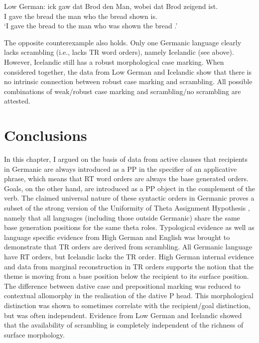 \begin{exe}
	 Low German:
	\gll ick gaw dat Brod den Man, wobei dat Brod zeigend ist.\\
	I gave the bread the man who the bread shown is.\\
	\trans `I gave the bread to the man who was shown the bread \citep{Mussaus.1829}.'
\end{exe}

The opposite counterexample also holds. Only one Germanic language clearly lacks scrambling (i.e., lacks TR word orders), namely Icelandic (see above). However, Icelandic still has a robust morphological case marking. When considered together, the data from Low German and Icelandic show that there is no intrinsic connection between robust case marking and scrambling. All possible combinations of weak/robust case marking and scrambling/no scrambling are attested.

\section{Conclusions}
In this chapter, I argued on the basis of data from active clauses that recipients in Germanic are always introduced as a PP in the specifier of an applicative phrase, which means that RT word orders are always the base generated orders. Goals, on the other hand, are introduced as a PP object in the complement of the verb. The claimed universal nature of these syntactic orders in Germanic proves a subset of the strong version of the Uniformity of Theta Assignment Hypothesis \citep{Baker.1988}, namely that all languages (including those outside Germanic) share the same base generation positions for the same theta roles.
	Typological evidence as well as language specific evidence from High German and English was brought to demonstrate that TR orders are derived from scrambling. All Germanic language have RT orders, but Icelandic lacks the TR order. High German internal evidence and data from marginal reconstruction in TR orders supports the notion that the theme is moving from a base position below the recipient to its surface position.
	The difference between dative case and prepositional marking was reduced to contextual allomorphy in the realisation of the dative P head. This morphological distinction was shown to sometimes correlate with the recipient/goal distinction, but was often independent. Evidence from Low German and Icelandic showed that the availability of scrambling is completely independent of the richness of surface morphology.

%
